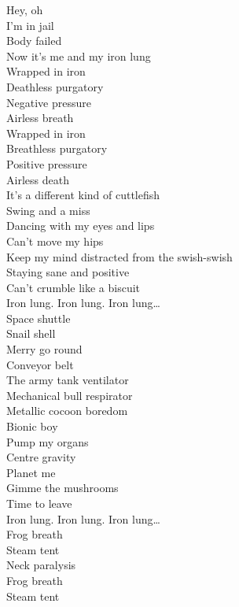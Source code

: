 
Hey, oh\\
I'm in jail\\
Body failed\\
Now it's me and my iron lung\\
Wrapped in iron\\
Deathless purgatory\\
Negative pressure\\
Airless breath\\
Wrapped in iron\\
Breathless purgatory\\
Positive pressure\\
Airless death\\

It's a different kind of cuttlefish\\
Swing and a miss\\
Dancing with my eyes and lips\\
Can't move my hips\\
Keep my mind distracted from the swish-swish\\
Staying sane and positive\\
Can't crumble like a biscuit\\

Iron lung. Iron lung. Iron lung…\\

Space shuttle\\
Snail shell\\
Merry go round\\
Conveyor belt\\
The army tank ventilator\\
Mechanical bull respirator\\
Metallic cocoon boredom\\
Bionic boy\\
Pump my organs\\
Centre gravity\\
Planet me\\
Gimme the mushrooms\\
Time to leave\\

Iron lung. Iron lung. Iron lung…\\

Frog breath\\
Steam tent\\
Neck paralysis\\
Frog breath\\
Steam tent\\

